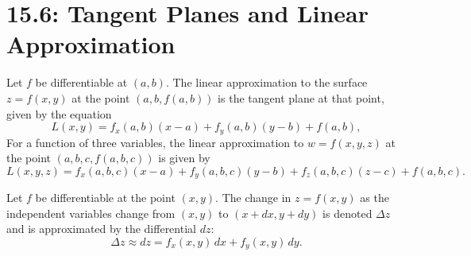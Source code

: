 \documentclass[mathNotesPreamble]{subfiles}
\begin{document}
\section{15.6: Tangent Planes and Linear Approximation}

  \noindent
  
  \begin{defn*}
    Let $f$ be differentiable at $(a,b)$. The linear approximation to the surface $z=f(x,y)$ at the point $(a,b,f(a,b))$ is the tangent plane at that point, given by the equation
      \[L(x,y)=f_x(a,b)(x-a)+f_y(a,b)(y-b)+f(a,b),\]
    For a function of three variables, the linear approximation to $w=f(x,y,z)$ at the point $(a,b,c,f(a,b,c))$ is given by
      \[L(x,y,z)=f_x(a,b,c)(x-a)+f_y(a,b,c)(y-b)+f_z(a,b,c)(z-c)+f(a,b,c).\]
  \end{defn*}

  \begin{defn*}
    Let $f$ be differentiable at the point $(x,y)$. The change in $z=f(x,y)$ as the independent variables change from $(x,y)$ to $(x+dx, y+dy)$ is denoted $\Delta z$ and is approximated by the differential $dz$:
      \[\Delta z\approx dz= f_x(x,y)\,dx+f_y(x,y)\,dy.\]
  \end{defn*}
  
  \pagebreak
  
\end{document}
